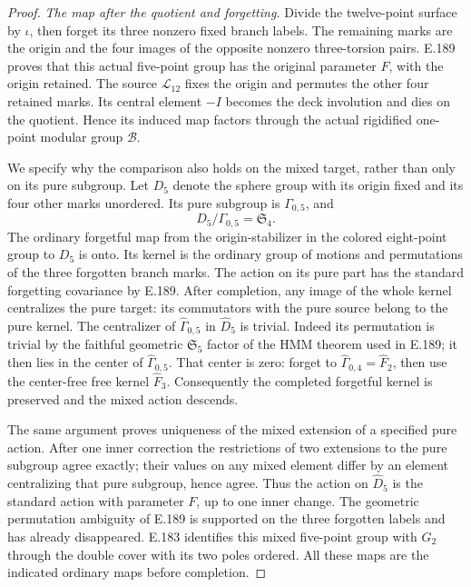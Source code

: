 \begin{proof}
\emph{The map after the quotient and forgetting.}
Divide the twelve-point surface by \(\iota\), then
forget its three nonzero fixed branch labels.
The remaining marks are the origin and the four
images of the opposite nonzero three-torsion pairs.
E.189 proves that this actual five-point group has
the original parameter \(F\), with the origin retained.
The source \(\mathcal L_{12}\) fixes the origin and
permutes the other four retained marks.  Its central
element \(-I\) becomes the deck involution and dies
on the quotient.  Hence its induced map factors
through the actual rigidified one-point modular group
\(\mathcal B\).

We specify why the comparison also holds on the
mixed target, rather than only on its pure subgroup.
Let \(D_5\) denote the sphere group with its origin
fixed and its four other marks unordered.  Its pure
subgroup is \(\Gamma_{0,5}\), and
\[
                 D_5/\Gamma_{0,5}=\mathfrak S_4.
\tag{E.190.7}
\]
The ordinary forgetful map from the origin-stabilizer
in the colored eight-point group to \(D_5\) is onto.
Its kernel is the ordinary group of motions and
permutations of the three forgotten branch marks.
The action on its pure part has the standard
forgetting covariance by E.189.  After completion,
any image of the whole kernel centralizes the
pure target: its commutators with the pure source
belong to the pure kernel.
The centralizer of \(\widehat\Gamma_{0,5}\) in
\(\widehat D_5\) is trivial.  Indeed its permutation
is trivial by the faithful geometric \(\mathfrak S_5\)
factor of the HMM theorem used in E.189; it then
lies in the center of \(\widehat\Gamma_{0,5}\).
That center is zero: forget to
\(\widehat\Gamma_{0,4}=\widehat F_2\), then use the
center-free free kernel \(\widehat F_3\).
Consequently the completed forgetful kernel is
preserved and the mixed action descends.

The same argument proves uniqueness of the mixed
extension of a specified pure action.  After one
inner correction the restrictions of two extensions
to the pure subgroup agree exactly; their values on
any mixed element differ by an element centralizing
that pure subgroup, hence agree.  Thus the action
on \(\widehat D_5\) is the standard action with
parameter \(F\), up to one inner change.
The geometric permutation ambiguity of E.189 is
supported on the three forgotten labels and has
already disappeared.  E.183 identifies this mixed
five-point group with \(G_2\) through the double
cover with its two poles ordered.  All these maps
are the indicated ordinary maps before completion.


\end{proof}
